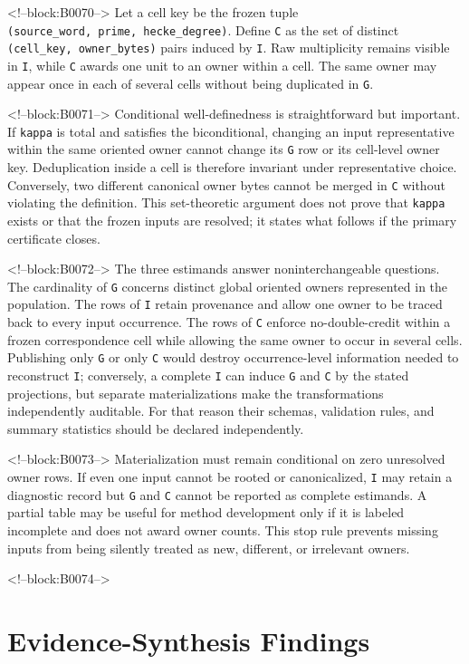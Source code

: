\documentclass[11pt]{article}
\begin{document}
<!--block:B0070-->
Let a cell key be the frozen tuple
\texttt{(source\_word,\ prime,\ hecke\_degree)}. Define \texttt{C} as
the set of distinct \texttt{(cell\_key,\ owner\_bytes)} pairs induced by
\texttt{I}. Raw multiplicity remains visible in \texttt{I}, while
\texttt{C} awards one unit to an owner within a cell. The same owner may
appear once in each of several cells without being duplicated in
\texttt{G}.

<!--block:B0071-->
Conditional well-definedness is straightforward but important. If
\texttt{kappa} is total and satisfies the biconditional, changing an
input representative within the same oriented owner cannot change its
\texttt{G} row or its cell-level owner key. Deduplication inside a cell
is therefore invariant under representative choice. Conversely, two
different canonical owner bytes cannot be merged in \texttt{C} without
violating the definition. This set-theoretic argument does not prove
that \texttt{kappa} exists or that the frozen inputs are resolved; it
states what follows if the primary certificate closes.

<!--block:B0072-->
The three estimands answer noninterchangeable questions. The cardinality
of \texttt{G} concerns distinct global oriented owners represented in
the population. The rows of \texttt{I} retain provenance and allow one
owner to be traced back to every input occurrence. The rows of
\texttt{C} enforce no-double-credit within a frozen correspondence cell
while allowing the same owner to occur in several cells. Publishing only
\texttt{G} or only \texttt{C} would destroy occurrence-level information
needed to reconstruct \texttt{I}; conversely, a complete \texttt{I} can
induce \texttt{G} and \texttt{C} by the stated projections, but separate
materializations make the transformations independently auditable. For
that reason their schemas, validation rules, and summary statistics
should be declared independently.

<!--block:B0073-->
Materialization must remain conditional on zero unresolved owner rows.
If even one input cannot be rooted or canonicalized, \texttt{I} may
retain a diagnostic record but \texttt{G} and \texttt{C} cannot be
reported as complete estimands. A partial table may be useful for method
development only if it is labeled incomplete and does not award owner
counts. This stop rule prevents missing inputs from being silently
treated as new, different, or irrelevant owners.

<!--block:B0074-->
\hypertarget{5-evidence-synthesis-findings}{%
\section{Evidence-Synthesis
Findings}\label{5-evidence-synthesis-findings}}
\end{document}
